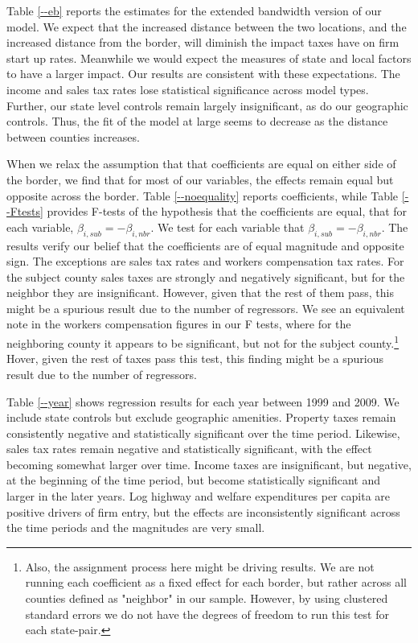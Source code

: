 \documentclass[12pt,a4paper]{article}
\begin{document}
Table \ref{--eb} reports the estimates for the extended bandwidth version of our model. We expect that the increased distance between the two locations, and the increased distance from the border, will diminish the impact taxes have on firm start up rates.  Meanwhile we would expect the  measures of state and local factors to have a larger impact.  Our results are consistent with these expectations. The income and sales tax rates lose statistical significance across model types. Further, our state level controls remain largely insignificant, as do our geographic controls. Thus, the fit of the model at large seems to decrease as the distance between counties increases. 

When we relax the assumption that  that coefficients are equal on either side of the border, we find that for most of our variables, the effects remain equal but opposite across the border. Table \ref{--noequality} reports coefficients, while Table \ref{--Ftests} provides F-tests of the hypothesis that the coefficients are equal, that for each variable, $\beta_{i,sub} = - \beta_{i,nbr}$. We test for each variable that $\beta_{i,sub} = - \beta_{i,nbr}$. The results verify our belief that the coefficients are of equal magnitude and opposite sign. The exceptions are sales tax rates and workers compensation tax rates. For the subject county sales taxes are strongly and negatively significant, but for the neighbor they are insignificant. However, given that the rest of them pass, this might be a spurious result due to the number of regressors. We see an equivalent note in the workers compensation figures in our F tests, where for the neighboring county it appears to be significant, but not for the subject county.\footnote{Also, the assignment process here might be driving results. We are not running each coefficient as a fixed effect for each border, but rather across all counties defined as "neighbor" in our sample. However, by using clustered standard errors we do not have the degrees of freedom to run this test for each state-pair.} Hover, given the rest of taxes pass this test, this finding might be a spurious result due to the number of regressors.

Table \ref{--year} shows regression results for each  year between 1999 and 2009. We include state controls but exclude geographic amenities. Property taxes remain consistently negative and statistically significant over the time period. Likewise, sales tax rates remain negative and statistically significant, with the effect becoming somewhat larger over time.  Income taxes are insignificant, but negative, at the beginning of the time period, but  become statistically significant and larger in the later years. Log highway and welfare expenditures per capita are positive drivers of firm entry, but the effects are inconsistently significant across the time periods and the magnitudes are very small.
\end{document}
